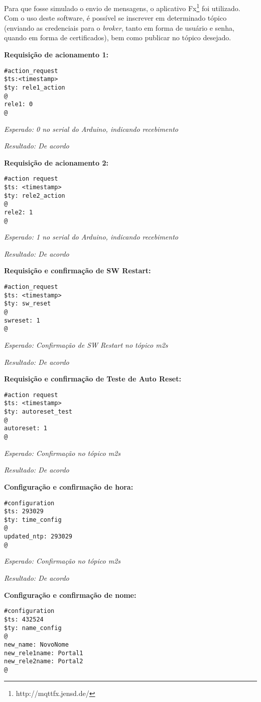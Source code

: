 Para que fosse simulado o envio de mensagens, o aplicativo \wmqtt{} Fx\footnote{http://mqttfx.jensd.de/} foi utilizado. Com o uso deste software, é possível se inscrever em determinado tópico (enviando as credenciais para o \emph{broker}, tanto em forma de usuário e senha, quando em forma de certificados), bem como publicar no tópico desejado.

\textbf{Requisição de acionamento 1:}
\begin{lstlisting}
#action_request
$ts:<timestamp>
$ty: rele1_action
@
rele1: 0
@
\end{lstlisting}

\emph{Esperado: 0 no serial do Arduino, indicando recebimento}

\emph{Resultado: De acordo}

\textbf{Requisição de acionamento 2:}
\begin{lstlisting}
#action request
$ts: <timestamp>
$ty: rele2_action
@
rele2: 1
@
\end{lstlisting}

\emph{Esperado: 1 no serial do Arduino, indicando recebimento}

\emph{Resultado: De acordo}

\textbf{Requisição e confirmação de SW Restart:}
\begin{lstlisting}
#action_request
$ts: <timestamp>
$ty: sw_reset
@
swreset: 1
@
\end{lstlisting}

\emph{Esperado: Confirmação de SW Restart no tópico \wmqtt{} m2s}

\emph{Resultado: De acordo}

\textbf{Requisição e confirmação de Teste de Auto Reset:}
\begin{lstlisting}
#action request
$ts: <timestamp>
$ty: autoreset_test
@
autoreset: 1
@
\end{lstlisting}

\emph{Esperado: Confirmação no tópico \wmqtt{} m2s}

\emph{Resultado: De acordo}

\textbf{Configuração e confirmação de hora:}
\begin{lstlisting}
#configuration
$ts: 293029
$ty: time_config
@
updated_ntp: 293029
@
\end{lstlisting}

\emph{Esperado: Confirmação no tópico \wmqtt{} m2s}

\emph{Resultado: De acordo}

\textbf{Configuração e confirmação de nome:}
\begin{lstlisting}
#configuration
$ts: 432524
$ty: name_config
@
new_name: NovoNome
new_rele1name: Portal1
new_rele2name: Portal2
@
\end{lstlisting}

